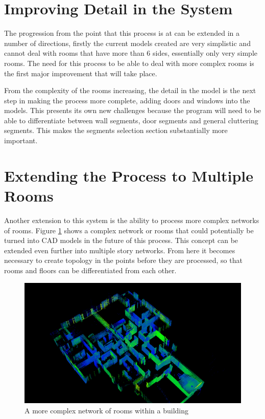 \section{Improving Detail in the System}

	The progression from the point that this process is at can be extended in a number of directions, firstly the current models created are very simplistic and cannot deal with rooms that have more than 6 sides, essentially only very simple rooms. The need for this process to be able to deal with more complex rooms is the first major improvement that will take place. 
	
	From the complexity of the rooms increasing, the detail in the model is the next step in making the process more complete, adding doors and windows into the models. This presents its own new challenges because the program will need to be able to differentiate between wall segments, door segments and general cluttering segments. This makes the segments selection section substantially more important.
	
\section{Extending the Process to Multiple Rooms}
	
	Another extension to this system is the ability to process more complex networks of rooms. Figure \ref{fig:complexscene} shows a complex network or rooms that could potentially be turned into CAD models in the future of this process. This concept can be extended even further into multiple story networks. From here it becomes necessary to create topology in the points before they are processed, so that rooms and floors can be differentiated from each other.
	
	
	\begin{figure}[htb]
		\centering
		\includegraphics[width=1\linewidth]{"Includes/images/Results/complex scene"}
		\caption{A more complex network of rooms within a building}
		\label{fig:complexscene}
	\end{figure}
	
